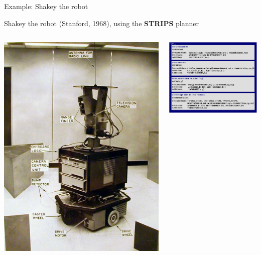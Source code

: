 \documentclass[compress]{beamer}
\begin{document}
\begin{frame}{Example: Shakey the robot}

    Shakey the robot (Stanford, 1968), using the \textbf{STRIPS} planner

    \begin{columns}
        \begin{column}{0.5\linewidth}
                \includegraphics[width=0.8\linewidth]{shakey}
        \end{column}
        \begin{column}{0.5\linewidth}
                \includegraphics[width=\linewidth]{shakey-strips}
        \end{column}
    \end{columns}

\end{frame}
\end{document}
